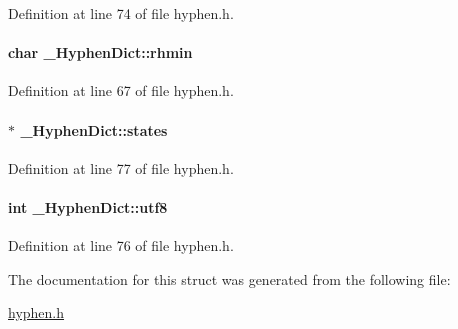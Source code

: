\-Definition at line 74 of file hyphen.\-h.

\hypertarget{struct___hyphen_dict_a3440b9768543e97e7e80d4ba29e1fa75}{
\paragraph[{rhmin}]{\setlength{\rightskip}{0pt plus 5cm}char {\bf \-\_\-\-Hyphen\-Dict\-::rhmin}}}\label{struct___hyphen_dict_a3440b9768543e97e7e80d4ba29e1fa75}


\-Definition at line 67 of file hyphen.\-h.

\hypertarget{struct___hyphen_dict_a27a77f586dc0a6925d074ba61294d985}{
\paragraph[{states}]{$\ast$ {\bf \-\_\-\-Hyphen\-Dict\-::states}}}\label{struct___hyphen_dict_a27a77f586dc0a6925d074ba61294d985}


\-Definition at line 77 of file hyphen.\-h.

\hypertarget{struct___hyphen_dict_afd01aac8b36d018ec931891e0e95a570}{
\paragraph[{utf8}]{\setlength{\rightskip}{0pt plus 5cm}int {\bf \-\_\-\-Hyphen\-Dict\-::utf8}}}\label{struct___hyphen_dict_afd01aac8b36d018ec931891e0e95a570}


\-Definition at line 76 of file hyphen.\-h.



\-The documentation for this struct was generated from the following file\-:\begin{DoxyCompactItemize}
\item 
\hyperlink{hyphen_8h}{hyphen.\-h}\end{DoxyCompactItemize}
